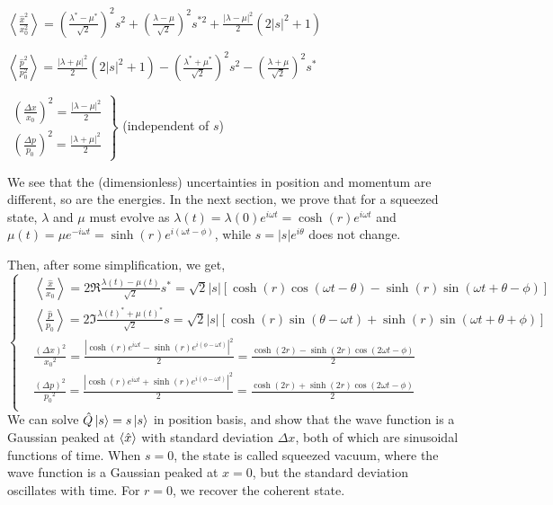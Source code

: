 \documentclass[12pt, twoside]{article}
\begin{document}
$\left\langle \frac { \hat{x} ^ { 2 } } { x_0 ^ { 2 } } \right\rangle = \left( \frac { \lambda ^ { * } - \mu ^ { * } } { \sqrt { 2 } } \right) ^ { 2 } s ^ { 2 } + \left( \frac { \lambda - \mu } { \sqrt { 2 } } \right) ^ { 2 } s ^ { *2 } + \frac { |\lambda - \mu| ^ { 2 } } { 2 } ( 2|s|^2+1 )$

$\left\langle \frac { \hat{p}^2 } { p_0 ^ 2 } \right\rangle  = \frac { | \lambda + \mu | ^ { 2 } } { 2 } \left( 2 | s | ^ { 2 } + 1 \right) - \left( \frac { \lambda^* + \mu ^ { * } } { \sqrt { 2 } } \right) ^ { 2 } s ^ { 2 } - \left( \frac { \lambda + \mu } { \sqrt { 2 } } \right) ^ { 2 } s ^ { * }$


$\left.\begin{array} { l } { \left(\frac{\Delta x}{x_0}\right)^2 = \frac{|\lambda - \mu|^2}{2} } \\ { \left(\frac{\Delta p}{p_0}\right)^2 = \frac{|\lambda + \mu|^2}{2} } \end{array} \right\}$ (independent of $s$)

We see that the (dimensionless) uncertainties in position and momentum are different, so are the energies.
In the next section, we prove that for a squeezed state, $\lambda$ and $\mu$ must evolve as $\lambda(t) = \lambda(0) e^{i\omega t} = \cosh(r) e^{i\omega t}$ and $\mu(t) = \mu e^{-i\omega t} = \sinh(r) e^{i(\omega t - \phi)}$, while $s = |s| e^{i\theta}$ does not change.

Then, after some simplification, we get, 
\begin{equation}
\begin{cases}

&{ \left\langle \frac{\hat{x}}{x_0} \right\rangle =2\Re{\frac{\lambda(t) - \mu(t)}{\sqrt{2}}s^*}=\sqrt{2}|s|[\cosh(r)\cos(\omega t - \theta) - \sinh(r)\sin(\omega t + \theta - \phi)]}\\
&{ \left\langle \frac{\hat{p}}{p_0} \right\rangle =2\Im{\frac{\lambda(t)^* + \mu(t)^*}{\sqrt{2}}s}=\sqrt{2}|s|[\cosh(r)\sin(\theta - \omega t) + \sinh(r)\sin(\omega t + \theta + \phi)]}\\
& { \frac{(\Delta x)^2}{{x_0}^2} = \frac { |\cosh(r)e^{i\omega t} - \sinh(r)e^{i(\phi - \omega t)}|^2 } { 2 } =  \frac{\cosh(2r) - \sinh(2r)\cos(2\omega t-\phi) }{2} }\\
& { \frac{(\Delta p)^2}{{p_0}^2} = \frac { |\cosh(r)e^{i\omega t} + \sinh(r)e^{i(\phi - \omega t)}|^2 } { 2 } =  \frac{\cosh(2r) + \sinh(2r)\cos(2\omega t-\phi) }{2} }\\

\end{cases}\end{equation}
We can solve $\hat{Q}\ket{s} = s\ket{s}$ in position basis, and show that the wave function is a Gaussian peaked at $\expval{\hat{x}}$ with standard deviation $\Delta x$, both of which are sinusoidal functions of time. When $s=0$, the state is called squeezed vacuum, where the wave function is a Gaussian peaked at $x=0$, but the standard deviation oscillates with time. For $r = 0$, we recover the coherent state.
\end{document}
